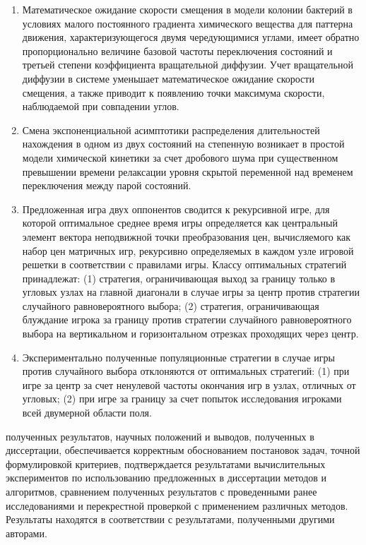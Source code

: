 {}
\begin{enumerate}[beginpenalty=10000] %
    \item Математическое ожидание скорости смещения в модели колонии бактерий в условиях малого постоянного градиента химического вещества для паттерна движения, характеризующегося двумя чередующимися углами, имеет обратно пропорционально величине базовой частоты переключения состояний и третьей степени коэффициента вращательной диффузии. Учет вращательной диффузии в системе уменьшает математическое ожидание скорости смещения, а также приводит к появлению точки максимума скорости, наблюдаемой при совпадении углов.
    \item Смена экспоненциальной асимптотики распределения длительностей нахождения в одном из двух состояний на степенную возникает в простой модели химической кинетики за счет дробового шума при существенном превышении времени релаксации уровня скрытой переменной над временем переключения между парой состояний. 
    \item Предложенная игра двух оппонентов сводится к рекурсивной игре, для которой оптимальное среднее время игры определяется как центральный элемент вектора неподвижной точки преобразования цен, вычисляемого как набор цен матричных игр, рекурсивно определяемых в каждом узле игровой решетки в соответствии с правилами игры. Классу оптимальных стратегий принадлежат: (1) стратегия, ограничивающая выход за границу только в угловых узлах на главной диагонали в случае игры за центр против стратегии случайного равновероятного выбора; (2) стратегия, ограничивающая блуждание игрока за границу против стратегии случайного равновероятного выбора на вертикальном и горизонтальном отрезках проходящих через центр.
    \item Экспериментально полученные популяционные стратегии в случае игры против случайного выбора отклоняются от оптимальных стратегий: (1) при игре за центр за счет ненулевой частоты окончания игр в узлах, отличных от угловых; (2) при игре за границу за счет попыток исследования игроками всей двумерной области поля. 
\end{enumerate}

{\reliability} полученных результатов, научных положений и выводов, полученных в диссертации, обеспечивается корректным обоснованием постановок задач, точной формулировкой критериев, подтверждается результатами вычислительных экспериментов по использованию предложенных в диссертации методов и алгоритмов, сравнением полученных результатов с проведенными ранее исследованиями и перекрестной проверкой с применением различных методов. Результаты находятся в соответствии с результатами, полученными другими авторами.

